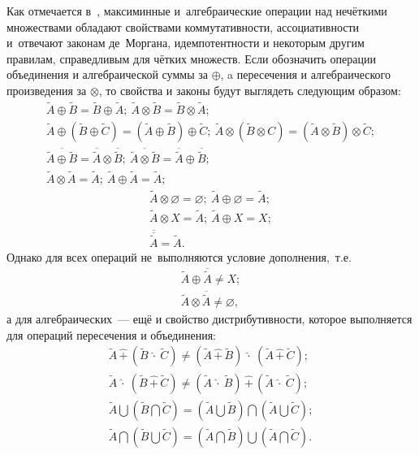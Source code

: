 Как отмечается в~\cite{Rutkovskaya, Kaufmann}, максиминные и~алгебраические операции над нечёткими множествами обладают свойствами коммутативности, ассоциативности и~отвечают законам де~Моргана, идемпотентности и некоторым другим правилам, справедливым для чётких множеств. Если обозначить операции объединения и алгебраической суммы за $\oplus$, a пересечения и алгебраического произведения за $\otimes$, то свойства и законы будут выглядеть следующим образом:
\begin{gather*}
	\tilde A \oplus \tilde B = \tilde B \oplus \tilde A;\ \tilde A \otimes \tilde B = \tilde B \otimes \tilde A; \allowbreak \\
	\tilde A \oplus \left(\tilde B \oplus \tilde C \right) = \left( \tilde A \oplus \tilde B \right) \oplus \tilde C;\ \tilde A \otimes \left(\tilde B \otimes C \right) = \left( \tilde A \otimes \tilde B \right) \otimes \tilde C; \allowbreak \\
	\overline{\tilde A \oplus \tilde B}=\overline{\tilde A} \otimes \overline{\tilde B};\  \overline{\tilde A \otimes \tilde B}=\overline{\tilde A} \oplus \overline{\tilde B}; \allowbreak \\
	\tilde A \otimes \tilde A = \tilde A;\ \tilde A \oplus \tilde A = \tilde A;
\end{gather*}
\begin{gather*}
	\tilde A \otimes \varnothing = \varnothing;\ \tilde A \oplus \varnothing = \tilde A; \allowbreak \\
	\tilde A \otimes X = \tilde A;\ \tilde A \oplus X = X; \\
	\overline{\overline{\tilde A}} = \tilde A.
\end{gather*}
Однако для всех операций не~выполняются условие дополнения,~т.е.
\begin{gather*}
	\tilde{A} \oplus \overline{\tilde{A}}\ne X; \\
	\tilde{A} \otimes \overline{\tilde{A}}\ne \varnothing,
\end{gather*}
а для алгебраических~--- ещё и свойство дистрибутивности, которое выполняется для операций пересечения и объединения:
\begin{gather*}
	\tilde{A}\, \widehat{+}\, \left( \tilde{B}\ \widehat{\cdot}\ \tilde C \right) \neq \left( \tilde A\, \widehat{+}\, \tilde B \right)\ \widehat{\cdot}\ \left(\tilde A\, \widehat{+}\, \tilde C \right); \\
		\tilde{A}\ \widehat{\cdot}\ \left( \tilde{B}\, \widehat{+}\, \tilde C \right) \neq \left( \tilde A\ \widehat{\cdot}\ \tilde B \right)\, \widehat{+}\, \left(\tilde A\ \widehat{\cdot}\ \tilde C \right); \\
	\tilde A \bigcup \left( \tilde B \bigcap \tilde C \right) = \left(\tilde A \bigcup \tilde B \right) \bigcap \left(\tilde A \bigcup \tilde C \right); \\
	\tilde A \bigcap \left( \tilde B \bigcup \tilde C \right) = \left(\tilde A \bigcap \tilde B \right) \bigcup \left(\tilde A \bigcap \tilde C \right).
\end{gather*}

